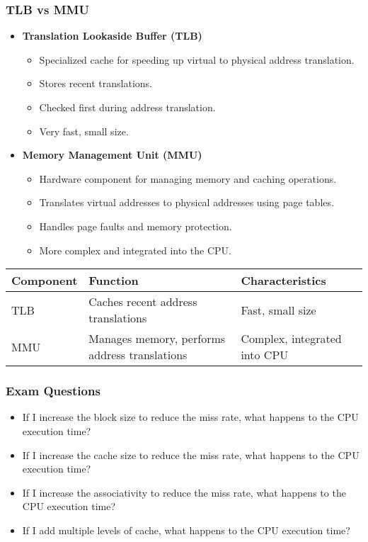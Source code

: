 \begin{frame}
    \frametitle{TLB vs MMU}

    \begin{itemize}
        \item \textbf{Translation Lookaside Buffer (TLB)}
        \begin{itemize}
            \item Specialized cache for speeding up virtual to physical address translation.
            \item Stores recent translations.
            \item Checked first during address translation.
            \item Very fast, small size.
        \end{itemize}
        \item \textbf{Memory Management Unit (MMU)}
        \begin{itemize}
            \item Hardware component for managing memory and caching operations.
            \item Translates virtual addresses to physical addresses using page tables.
            \item Handles page faults and memory protection.
            \item More complex and integrated into the CPU.
        \end{itemize}
    \end{itemize}
    
    \begin{table}[h!]
        \centering
        \begin{tabular}{|p{2cm}|p{3cm}|p{3cm}|}
            \hline
            \textbf{Component} & \textbf{Function} & \textbf{Characteristics} \\
            \hline
            TLB & Caches recent address translations & Fast, small size \\
            \hline
            MMU & Manages memory, performs address translations & Complex, integrated into CPU \\
            \hline
        \end{tabular}
    \end{table}

\end{frame}

\begin{frame}
    \frametitle{Exam Questions}
    \begin{itemize}
        \item If I increase the block size to reduce the miss rate, what happens to the CPU execution time?
        \item If I increase the cache size to reduce the miss rate, what happens to the CPU execution time?
        \item If I increase the associativity to reduce the miss rate, what happens to the CPU execution time?
        \item If I add multiple levels of cache, what happens to the CPU execution time?
    \end{itemize}
\end{frame}

